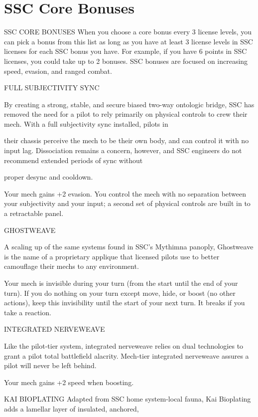 \section{SSC Core Bonuses}

                                         SSC CORE BONUSES
When you choose a core bonus every 3 license levels, you can pick a bonus from this list as long
as you have at least 3 license levels in SSC licenses for each SSC bonus you have. For example,
if you have 6 points in SSC licenses, you could take up to 2 bonuses. SSC bonuses are focused
on increasing speed, evasion, and ranged combat.


FULL SUBJECTIVITY SYNC

By creating a strong, stable, and secure biased two-way ontologic bridge, SSC has removed the need for a
pilot to rely primarily on physical controls to crew their mech. With a full subjectivity sync installed, pilots in

their chassis perceive the mech to be their own body, and can control it with no input lag. Dissociation
remains a concern, however, and SSC engineers do not recommend extended periods of sync without

proper desync and cooldown.

Your mech gains +2 evasion. You control the mech with no separation between your subjectivity
and your input; a second set of physical controls are built in to a retractable panel.


GHOSTWEAVE

A scaling up of the same systems found in SSC’s Mythimna panoply, Ghostweave is the name of a
proprietary applique that licensed pilots use to better camouflage their mechs to any environment.

Your mech is invisible during your turn (from the start until the end of your turn). If you do nothing
on your turn except move, hide, or boost (no other actions), keep this invisibility until the start of
your next turn. It breaks if you take a reaction.


INTEGRATED NERVEWEAVE

Like the pilot-tier system, integrated nerveweave relies on dual technologies to grant a pilot total battlefield
alacrity. Mech-tier integrated nerveweave assures a pilot will never be left behind.

Your mech gains +2 speed when boosting.


KAI BIOPLATING
Adapted from SSC home system-local fauna, Kai Bioplating adds a lamellar layer of insulated, anchored,

